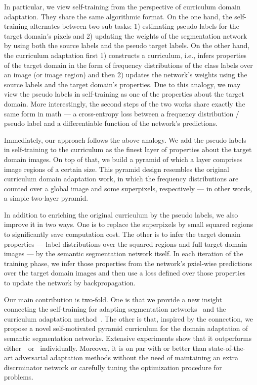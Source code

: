 \documentclass[10pt,twocolumn,letterpaper]{article}
\begin{document}
In particular, we view self-training from the perspective of curriculum domain adaptation. They share the same algorithmic format. On the one hand, the self-training alternates between two sub-tasks: 1) estimating pseudo labels for the target domain's pixels and 2) updating the weights of the segmentation network by using both the source labels and the pseudo target labels. On the other hand, the curriculum adaptation first 1) constructs a curriculum, i.e., infers properties of the target domain in the form of frequency distributions of the class labels over an image (or image region) and then 2) updates the network's weights using the source labels and the target domain's properties. Due to this analogy, we may view the pseudo labels in self-training as one of the properties about the target domain. More interestingly, the second steps of the two works share exactly the same form in math --- a cross-entropy loss between a frequency distribution / pseudo label and a differentiable function of the network's predictions.

Immediately, our approach follows the above analogy. We add the pseudo labels in self-training to the curriculum as the finest layer of properties about the target domain images. On top of that, we build a pyramid of which a layer comprises image regions of a certain size. This pyramid design resembles the original curriculum domain adaptation work, in which the frequency distributions are counted over a global image and some superpixels, respectively --- in other words, a simple two-layer pyramid.


In addition to enriching the original curriculum by the pseudo labels, we also improve it in two ways. One is to replace the superpixels by small squared regions to significantly save computation cost. The other is to infer the target domain properties --- label distributions over the squared regions and full target domain images --- by the semantic segmentation network itself. In each  iteration of the training phase, we infer those  properties from the network's pxiel-wise predictions over the target domain images and then use a loss defined over those properties to update the network by backpropagation.




Our main contribution is two-fold. One is that we provide a new insight connecting the self-training for adapting segmentation networks~\cite{self_motivated_2018_ECCV} and the curriculum adaptation method~\cite{zhang2017curriculum,curriculum_tpami}.  The other is that, inspired by the connection, we propose a novel self-motivated pyramid curriculum for the domain adaptation of semantic segmentation networks. Extensive experiments show that it outperforms either~\cite{self_motivated_2018_ECCV}~or~\cite{curriculum_tpami} individually. Moreover, it is on par with or better than state-of-the-art adversarial adaptation methods without the need of maintaining an extra discrminator network or carefully tuning the optimization procedure for  problems.
\end{document}
